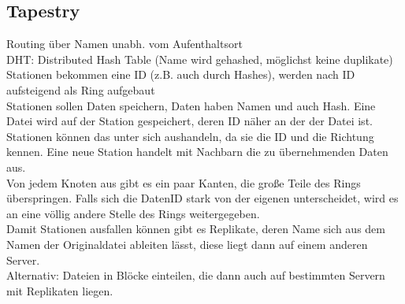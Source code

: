 \documentclass[a4paper]{article}
\begin{document}
\subsection{Tapestry}
Routing über Namen unabh. vom Aufenthaltsort\\
DHT: Distributed Hash Table (Name wird gehashed, möglichst keine duplikate)\\
Stationen bekommen eine ID (z.B. auch durch Hashes), werden nach ID aufsteigend als Ring aufgebaut\\
Stationen sollen Daten speichern, Daten haben Namen und auch Hash. Eine Datei wird auf der Station gespeichert, deren ID näher an der der Datei  ist. Stationen können das unter sich aushandeln, da sie die ID und die Richtung kennen. Eine neue Station handelt mit Nachbarn die zu übernehmenden Daten aus.\\
Von jedem Knoten aus gibt es ein paar Kanten, die große Teile des Rings überspringen. Falls sich die DatenID stark von der eigenen unterscheidet, wird es an eine völlig andere Stelle des Rings weitergegeben.\\
Damit Stationen ausfallen können gibt es Replikate, deren Name sich aus dem Namen der Originaldatei ableiten lässt, diese liegt dann auf einem anderen Server.\\
Alternativ: Dateien in Blöcke einteilen, die dann auch auf bestimmten Servern mit Replikaten liegen.\\
\end{document}
